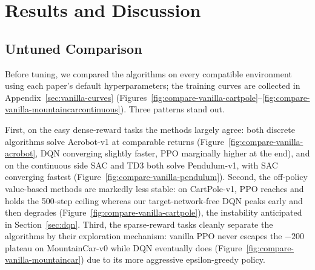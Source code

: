 \documentclass{article}
\begin{document}

\section{Results and Discussion}


\subsection{Untuned Comparison}
\label{sec:vanilla-comparison}

Before tuning, we compared the algorithms on every compatible environment using each paper's default hyperparameters; the training curves are collected in Appendix~\ref{sec:vanilla-curves} (Figures~\ref{fig:compare-vanilla-cartpole}--\ref{fig:compare-vanilla-mountaincarcontinuous}). Three patterns stand out. 

First, on the easy dense-reward tasks the methods largely agree: both discrete algorithms solve Acrobot-v1 at comparable returns (Figure~\ref{fig:compare-vanilla-acrobot}, DQN converging slightly faster, PPO marginally higher at the end), and on the continuous side SAC and TD3 both solve Pendulum-v1, with SAC converging fastest (Figure~\ref{fig:compare-vanilla-pendulum}). Second, the off-policy value-based methods are markedly less stable: on CartPole-v1, PPO reaches and holds the 500-step ceiling whereas our target-network-free DQN peaks early and then degrades (Figure~\ref{fig:compare-vanilla-cartpole}), the instability anticipated in Section~\ref{sec:dqn}. Third, the sparse-reward tasks cleanly separate the algorithms by their exploration mechanism: vanilla PPO never escapes the $-200$ plateau on MountainCar-v0 while DQN eventually does (Figure~\ref{fig:compare-vanilla-mountaincar}) due to its more aggressive epsilon-greedy policy. 
\end{document}
